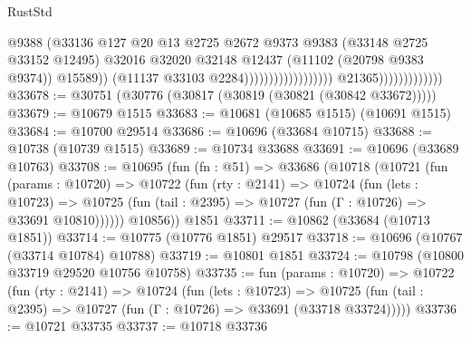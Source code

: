 \begin{lexlean}{RustStd}
\begin{coremodule}
                                                                  @9388
                                                                  (@33136
                                                                    @127
                                                                    @20
                                                                    @13
                                                                    @2725
                                                                    @2672
                                                                    @9373
                                                                    @9383
                                                                    (@33148 @2725 @33152 @12495)
                                                                    @32016
                                                                    @32020
                                                                    @32148
                                                                    @12437
                                                                    (@11102 (@20798 @9383 @9374))
                                                                    @15589))
                                                                (@11137
                                                                  @33103
                                                                  @2284))))))))))))))))))
                              @21365)))))))))))))
@33678 := @30751 (@30776 (@30817 (@30819 (@30821 (@30842 @33672)))))
@33679 := @10679 @1515
@33683 := @10681 (@10685 @1515) (@10691 @1515)
@33684 := @10700 @29514
@33686 := @10696 (@33684 @10715)
@33688 := @10738 (@10739 @1515)
@33689 := @10734 @33688
@33691 := @10696 (@33689 @10763)
@33708 := @10695
    (fun (fn : @51) =>
    @33686
      (@10718
        (@10721
          (fun (params : @10720) =>
          @10722
            (fun (rty : @2141) =>
            @10724
              (fun (lets : @10723) =>
              @10725 (fun (tail : @2395) => @10727 (fun (Γ : @10726) => @33691 @10810))))))
        @10856))
    @1851
@33711 := @10862 (@33684 (@10713 @1851))
@33714 := @10775 (@10776 @1851) @29517
@33718 := @10696 (@10767 (@33714 @10784) @10788)
@33719 := @10801 @1851
@33724 := @10798 (@10800 @33719 @29520 @10756 @10758)
@33735 := fun (params : @10720) =>
  @10722
    (fun (rty : @2141) =>
    @10724
      (fun (lets : @10723) =>
      @10725 (fun (tail : @2395) => @10727 (fun (Γ : @10726) => @33691 (@33718 @33724)))))
@33736 := @10721 @33735
@33737 := @10718 @33736

\end{coremodule}
\end{lexlean}
